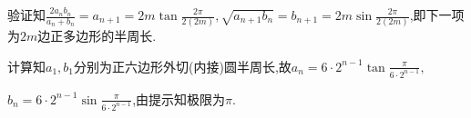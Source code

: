 \documentclass{exam}
\begin{document}
\begin{questions}
\begin{parts}
\begin{solution}
            验证知$\frac{2a_nb_n}{a_n+b_n}=a_{n+1}=2m\tan\frac{2\pi}{2(2m)},
            \sqrt{a_{n+1}b_n}=b_{n+1}=2m\sin\frac{2\pi}{2(2m)}$,即下一项为$2m$边正多边形的半周长.

            计算知$a_1,b_1$分别为正六边形外切(内接)圆半周长,故$a_n=6\cdot2^{n-1}\tan\frac{\pi}{6\cdot2^{n-1}},$
            
            $b_n=6\cdot2^{n-1}\sin\frac{\pi}{6\cdot2^{n-1}}$,由提示知极限为$\pi$.
        \end{solution}
    \end{parts}

\end{questions}
\end{document}

